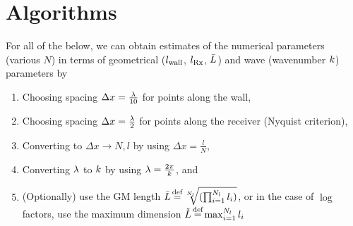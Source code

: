 \documentclass[lettersize,journal]{IEEEtran}
\begin{document}

\newpage
\appendices
\section{Algorithms}\label{app:algs}
For all of the below, we can obtain estimates of the numerical parameters (various
$N$) in terms of geometrical ($l_{\text{wall} }$, $l_{\text{Rx} }$, $\bar{L}$) and wave (wavenumber
$k$) parameters by
\begin{enumerate}
   \item Choosing spacing $\Delta x = \frac{\lambda}{10}$ for points along the wall,
   \item Choosing spacing $\Delta x = \frac{\lambda}{2}$ for points along the
      receiver (Nyquist criterion),
   \item Converting to $\Delta x \to N, l$ by using $\Delta x = \frac{l}{N}$,
   \item Converting $\lambda$ to $k$ by using $\lambda = \frac{2
      \pi}{k}$, and
   \item (Optionally) use the GM length $\meanLength \defeq
      \sqrt[\numSurfs]{(\prod_{i=1}^{\numSurfs} l_i)}$, or in the case of $\log$
      factors, use the maximum dimension $\bigLength \defeq \max_{i=1}^{\numSurfs}
      l_i$
\end{enumerate}
\end{document}
